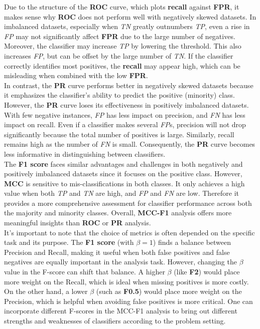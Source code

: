\documentclass[12pt, oneside]{amsart}
\theoremstyle{definition}
\theoremstyle{remark}
\numberwithin{equation}{section}
\begin{document}
Due to the structure of the \textbf{ROC} curve, which plots \textbf{recall} against \textbf{FPR}, it makes sense why \textbf{ROC} does not perform well with negatively skewed datasets. In imbalanced datasets, especially when \textit{TN} greatly outnumbers \textit{TP}, even a rise in \textit{FP} may not significantly affect \textbf{FPR} due to the large number of negatives. Moreover, the classifier may increase \textit{TP} by lowering the threshold. This also increases \textit{FP}, but can be offset by the large number of \textit{TN}. If the classifier correctly identifies most positives, the \textbf{recall} may appear high, which can be misleading when combined with the low \textbf{FPR}. \\

In contrast, the \textbf{PR} curve performs better in negatively skewed datasets because it emphasizes the classifier's ability to predict the positive (minority) class. However, the \textbf{PR} curve loses its effectiveness in positively imbalanced datasets. With few negative instances, \textit{FP} has less impact on precision, and \textit{FN} has less impact on recall. Even if a classifier makes several \textit{FP}s, precision will not drop significantly because the total number of positives is large. Similarly, recall remains high as the number of \textit{FN} is small. Consequently, the \textbf{PR} curve becomes less informative in distinguishing between classifiers. \\

The \textbf{F1 score} faces similar advantages and challenges in both negatively and positively imbalanced datasets since it focuses on the positive class. However, \textbf{MCC} is sensitive to mis-classifications in both classes. It only achieves a high value when both \textit{TP} and \textit{TN} are high, and \textit{FP} and \textit{FN} are low. Therefore it provides a more comprehensive assessment for classifier performance across both the majority and minority classes. Overall, \textbf{MCC-F1} analysis offers more meaningful insights than \textbf{ROC} or \textbf{PR} analysis.  \\

It’s important to note that the choice of metrics is often depended on the specific task and its purpose. The \textbf{F1 score} (with $\beta=1$) finds a balance between Precision and Recall, making it useful when both false positives and false negatives are equally important in the analysis task. However, changing the $\beta$ value in the F-score can shift that balance. A higher $\beta$ (like \textbf{F2}) would place more weight on the Recall, which is ideal when missing positives is more costly. On the other hand, a lower $\beta$ (such as \textbf{F0.5}) would place more weight on the Precision, which is helpful when avoiding false positives is more critical. One can incorporate different F-scores in the MCC-F1 analysis to bring out different strengths and weaknesses of classifiers according to the problem setting.
\end{document}

